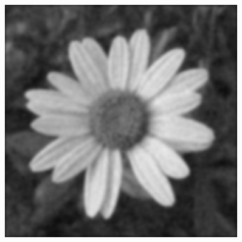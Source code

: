 \documentclass[a4paper]{report}
\begin{document}
\begin{figure}[H]
\begin{minipage}{.3\textwidth}
\end{minipage}%
\begin{minipage}{.3\textwidth}
  \centering
  \includegraphics[width=0.9\textwidth]{images/Smooth/frequency-gaussian/flower_smooth_frequency_gaussian_50_1.png}
\end{minipage}
\end{figure}
\end{document}
